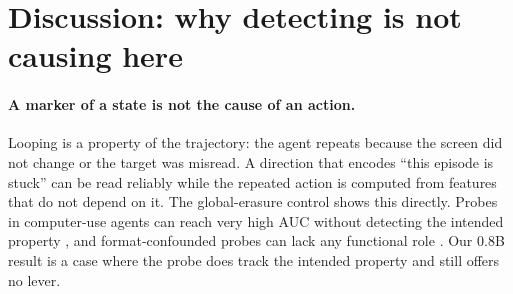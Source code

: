 \section{Discussion: why detecting is not causing here}
\label{sec:discussion}

\paragraph{A marker of a state is not the cause of an action.} Looping is a property of the trajectory: the agent repeats because the screen did not change or the target was misread. A direction that encodes ``this episode is stuck'' can be read reliably while the repeated action is computed from features that do not depend on it. The global-erasure control shows this directly. Probes in computer-use agents can reach very high AUC without detecting the intended property \citep{li2026auc}, and format-confounded probes can lack any functional role \citep{sahoo2026format}. Our 0.8B result is a case where the probe does track the intended property and still offers no lever.

